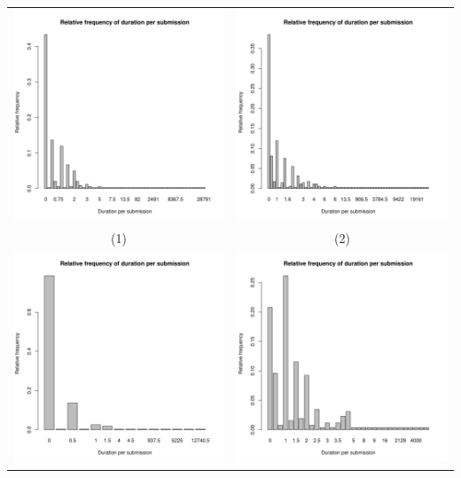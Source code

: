 \documentclass[a4paper]{article}
\theoremstyle{definition}
\begin{document}
\begin{enumerate}[a)]
\begin{itemize}
\begin{center}
            \begin{tabular}{c c}
                 \includegraphics[width = 6.9cm]{Images/img4-5-1.png} & \includegraphics[width = 6.9cm]{Images/img4-5-2.png} \\
                 (1) & (2) \\
                 \includegraphics[width = 6.9cm]{Images/img4-5-3.png} &
                 \includegraphics[width = 6.9cm]{Images/img4-5-4.png} \\

\end{tabular}
\end{center}
\end{itemize}
\end{enumerate}
\end{document}

